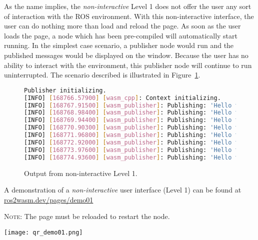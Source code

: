         As the name implies, the \textit{non-interactive} Level 1 does not offer the user
        any sort of interaction with the \ac{ROS} environment. With this non-interactive
        interface, the user can do nothing more than load and reload the page. 
        As soon as the user loads the page, a node which has been pre-compiled 
        will automatically start running. In the simplest case scenario, a publisher
        node would run and the published messages would be displayed on the window.
        Because the user has no ability to interact with the environment, this
        publisher node will continue to run uninterrupted. The scenario described
        is illustrated in Figure~\ref{fig:ui1}.

        \begin{figure}[htbp]
            \centering
            \begin{lstlisting}[language=Bash]
Publisher initializing.
[INFO] [168766.57900] [wasm_cpp]: Context initializing.
[INFO] [168767.91500] [wasm_publisher]: Publishing: 'Hello there! 0'
[INFO] [168768.98400] [wasm_publisher]: Publishing: 'Hello there! 1'
[INFO] [168769.94400] [wasm_publisher]: Publishing: 'Hello there! 2'
[INFO] [168770.90300] [wasm_publisher]: Publishing: 'Hello there! 3'
[INFO] [168771.96800] [wasm_publisher]: Publishing: 'Hello there! 4'
[INFO] [168772.92000] [wasm_publisher]: Publishing: 'Hello there! 5'
[INFO] [168773.97600] [wasm_publisher]: Publishing: 'Hello there! 6'
[INFO] [168774.93600] [wasm_publisher]: Publishing: 'Hello there! 7'\end{lstlisting}
            \caption{Output from non-interactive Level 1.}\label{fig:ui1}
        \end{figure}

        \begin{tcolorbox}[title=Example 1]
            \begin{minipage}[t]{0.87\linewidth}
                \vspace*{0pt}
                A demonstration of a \textit{non-interactive} user interface (Level 1) can
                be found at \href{https://ros2wasm.dev/pages/demo01/index.html}{\textsf{ros2wasm.dev/pages/demo01}}

                \textsc{Note:} The page must be reloaded to restart the node.
            \end{minipage}\hfill%
            \begin{minipage}[t]{0.1\linewidth}
                \vspace*{0pt}
                \texttt{[image: qr\_demo01.png]}
            \end{minipage}
        \end{tcolorbox}


